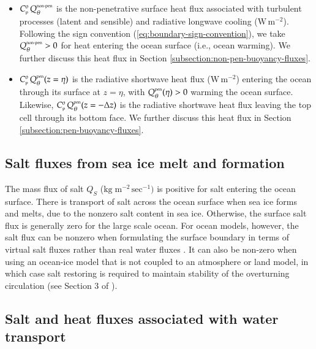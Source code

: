 \begin{itemize}
\item $C_{\mbox{\tiny p}}^{o} \, Q_{\theta}^{\mbox{\tiny non-pen}}$ is
  the non-penetrative surface heat flux associated with turbulent
  processes (latent and sensible) and radiative longwave cooling
  ($\mbox{W} \, \mbox{m}^{-2}$).  Following the sign convention
  (\ref{eq:boundary-sign-convention}), we take
  $Q_{\theta}^{\mbox{\tiny non-pen}} > 0$ for heat entering the ocean
  surface (i.e., ocean warming).  We further discuss this heat flux in
  Section \ref{subsection:non-pen-buoyancy-fluxes}.

\item $C_{\mbox{\tiny p}}^{o} \, Q_{\theta}^{\mbox{\tiny pen}}(z=\eta)$ is the
  radiative shortwave heat flux ($\mbox{W} \, \mbox{m}^{-2}$) entering
  the ocean through its surface at $z=\eta$, with
  $Q_{\theta}^{\mbox{\tiny pen}}(\eta) > 0$ warming the ocean surface.
  Likewise, $C_{\mbox{\tiny p}}^{o} \, Q_{\theta}^{\mbox{\tiny pen}}(z=-\Delta z)$ is
  the radiative shortwave heat flux leaving the top cell through its
  bottom face.  We further discuss this heat flux in Section
  \ref{subsection:pen-buoyancy-fluxes}.

\end{itemize}


\subsection{Salt fluxes from sea ice melt and formation} 
\label{subsection:sea-ice-buoyancy-fluxes}

The mass flux of salt $Q_{S}$ ($\mbox{kg} \; \mbox{m}^{-2} \,
\mbox{sec}^{-1})$ is positive for salt entering the ocean surface.
There is transport of salt across the ocean surface when sea ice forms
and melts, due to the nonzero salt content in sea ice.  Otherwise, the
surface salt flux is generally zero for the large scale ocean. For
ocean models, however, the salt flux can be nonzero when formulating
the surface boundary in terms of virtual salt fluxes rather than real
water fluxes \citep{Huang1993,GriffiesPacSchmidtBalaji2001}.  It can
also be non-zero when using an ocean-ice model that is not coupled to
an atmosphere or land model, in which case salt restoring is required
to maintain stability of the overturning circulation (see Section 3 of
\cite{CORE_NYF}).


\subsection{Salt and heat fluxes associated with water transport} 
\label{subsection:advective-buoyancy-fluxes}

